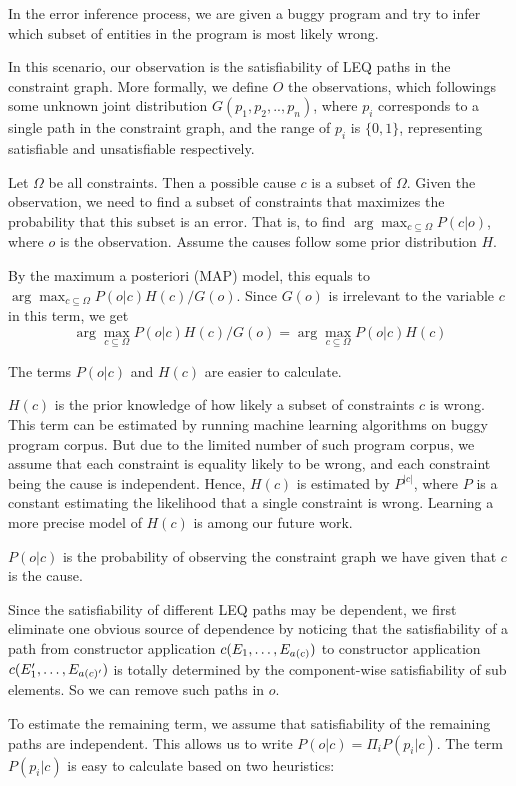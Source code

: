In the error inference process, we are given a buggy program and try to infer
which subset of entities in the program is most likely wrong.  

In this scenario, our observation is the satisfiability of LEQ paths in the
constraint graph. More formally, we define $O$ the observations, which
followings some unknown joint distribution $G(p_1, p_2, .., p_n)$, where
$p_i$ corresponds to a single path in the constraint graph, and the range of
$p_i$ is $\{0, 1\}$, representing satisfiable and unsatisfiable respectively.

Let $\Omega$ be all constraints. Then a possible cause $c$ is a subset of
$\Omega$. Given the observation, we need to find a subset of constraints that
maximizes the probability that this subset is an error. That is, to find
$\arg\max_{c \subseteq \Omega} P(c|o)$, where $o$ is the observation.  Assume the
causes follow some prior distribution $H$.

By the maximum a posteriori (MAP) model, this equals to $\arg\max_{c \subseteq
\Omega} P(o|c) H(c) / G(o)$. Since $G(o)$ is irrelevant to the variable $c$ in
this term, we get
\[\arg\max_{c \subseteq \Omega} P(o|c) H(c) / G(o) =  \arg\max_{c
\subseteq \Omega} P(o|c) H(c)\]

The terms $P(o|c)$ and $H(c)$ are easier to calculate.

$H(c)$ is the prior knowledge of how likely a subset of constraints $c$ is
wrong. This term can be estimated by running machine learning algorithms on
buggy program corpus. But due to the limited number of such program corpus, we
assume that each constraint is equality likely to be wrong, and each constraint
being the cause is independent. Hence, $H(c)$ is estimated by $P^{|c|}$, where
$P$ is a constant estimating the likelihood that a single constraint is wrong.
Learning a more precise model of $H(c)$ is among our future work.

$P(o|c)$ is the probability of observing the constraint graph we have given
that $c$ is the cause.

Since the satisfiability of different LEQ paths may be dependent, we first
eliminate one obvious source of dependence by noticing that the satisfiability
of a path from constructor application $c(E_1, \dots, E_{a(c)})$ to
constructor application $c(E_1', \dots, E_{a(c)'})$ is totally determined
by the component-wise satisfiability of sub elements. So we can remove such
paths in $o$.

To estimate the remaining term, we assume that satisfiability of the remaining
paths are independent. This allows us to write $P(o|c) = \Pi_i P(p_i|c)$. The
term $P(p_i|c)$ is easy to calculate based on two heuristics:


